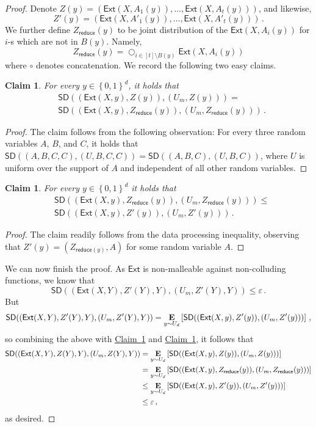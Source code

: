 \documentclass[11pt]{article}
\numberwithin{equation}{section}
\newtheorem{claim}[theorem]{Claim}
\theoremstyle{definition}
\theoremstyle{plain}
\newcommand{\expref}[2]{\hyperref[#2]{#1~\ref{#2}}}
\newcommand{\ext}{\mathsf{Ext}}
\newcommand{\eps}{\varepsilon}
\newcommand{\set}[1]{\left\{{#1}\right\}}
\newcommand{\B}{\set{0,1}}
\newcommand{\E}{\mathop{\bf E\/}}
\def\SD{\ensuremath{\mathsf{SD}}}
\begin{document}
\begin{proof}
Denote $Z(y) = ( \ext(X,A_{1}(y)),\ldots,\ext(X,A_{t}(y)) )$, and likewise,
\[Z'(y) = ( \ext(X,A'_{1}(y)),\ldots,\ext(X,A'_{t}(y)) )\,.\] We further
define $Z_{\mathsf{reduce}}(y)$ to be joint distribution of the $\ext(X,A_i(y))$ for $i$-s which
are not in $B(y)$. Namely,
\[
Z_{\mathsf{reduce}}(y) = \bigcirc_{i \in [t] \setminus B(y)} \ext(X,A_{i}(y))
\]
where $\circ$ denotes concatenation. 
We record the following two easy claims.
\begin{claim}\label{claim:sec41}
For every $y \in \B^d$,
it holds that
\begin{align*}
&\SD((\ext(X,y),Z(y)),(U_m,Z(y))) =  \\ &\SD((\ext(X,y),Z_{\mathsf{reduce}}(y)),(U_m,Z_{\mathsf{reduce}}(y)))\,.
\end{align*}
\end{claim}
\begin{proof}
The claim follows from the following observation: For every three random variables $A$, $B$, and $C$,
it holds that $\SD((A,B,C,C),(U,B,C,C)) = \SD((A,B,C),(U,B,C))$, where $U$ is uniform over the support of
$A$ and independent of all other random variables.
\end{proof}

\begin{claim}\label{claim:sec42}
For every $y \in \B^d$ it holds that
\begin{align*}
&\SD((\ext(X,y),Z_{\mathsf{reduce}}(y)),(U_m,Z_{\mathsf{reduce}}(y))) \le \\
&\SD((\ext(X,y),Z'(y)),(U_m,Z'(y)))\,.
\end{align*}
\end{claim}
\begin{proof}
The claim readily follows from the data processing inequality, observing that
$Z'(y) = (Z_{\mathsf{reduce}(y)},A)$ for some random variable $A$.
\end{proof}

We can now finish the proof. As $\ext$ is non-malleable against non-colluding functions,
we know that
\[
\SD((\ext(X,Y),Z'(Y),Y),(U_m,Z'(Y),Y)) \le \eps\,.
\]
But
\[
\SD((\ext(X,Y),Z'(Y),Y),(U_m,Z'(Y),Y))  = \E_{y \sim U_d}\left[ \SD((\ext(X,y),Z'(y)),(U_m,Z'(y))) \right]\,,
\]
so
combining the above with \expref{Claim}{claim:sec41} and \expref{Claim}{claim:sec42}, it follows that
\begin{align*}
\SD((\ext(X,Y),Z(Y),Y),(U_m,Z(Y),Y)) &= \E_{y \sim U_d}\left[ \SD((\ext(X,y),Z(y)),(U_m,Z(y))) \right] \\
&= \E_{y \sim U_d}\left[ \SD((\ext(X,y),Z_{\mathsf{reduce}}(y)),(U_m,Z_{\mathsf{reduce}}(y))) \right] \\
&\le \E_{y \sim U_d}\left[ \SD((\ext(X,y),Z'(y)),(U_m,Z'(y))) \right] \\
&\le \eps\,,
\end{align*}
as desired. 
\end{proof}
\end{document}
